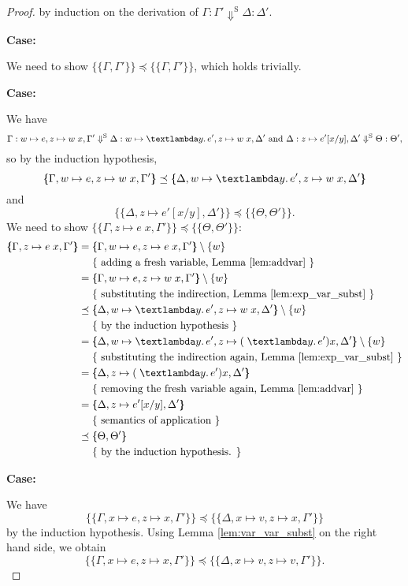 \documentclass{jfp1}
\theoremstyle{nonumberbreak}
\newtheorem{proof}{Proof}
\newcommand{\sApp}[2]{#1\;#2}
\newcommand{\sLam}[2]{\text{\textlambda} #1.\, #2}
\newcommand{\ssred}[4]{#1 : #2 \Downarrow^{\textrm{S}} #3 : #4}
\newcommand{\sRule}[1]{\text{{\textsc{#1}}}}
\newcommand{\esem}[1]{\{\!\!\!\{#1\}\!\!\!\}}
\newcommand{\case}[1]{\par\smallskip\noindent\textbf{Case:} #1\nopagebreak\par\noindent\ignorespaces}
\newcommand{\aexpl}[1]{&\mathrel{\phantom{=}}\left\{\text{ #1 }\right\}}
\begin{document}
\begin{proof}
by induction on the derivation of $\ssred \Gamma {\Gamma'} {\Delta} {\Delta'}$.

\case{\sRule{Lam}}
We need to show $\esem{\Gamma, \Gamma'} \preceq \esem{\Gamma, \Gamma'}$, which holds trivially.

\case{\sRule{App}}
We have
\[
\ssred{\Gamma}{w \mapsto e, z \mapsto \sApp w x, \Gamma'}{\Delta}{w \mapsto \sLam y e', z \mapsto \sApp w x, \Delta'}
\text{ and }
\ssred{\Delta}{z \mapsto e'[x/y], \Delta'}{\Theta}{\Theta'},
\]
so by the induction hypothesis,
\[
\esem{\Gamma, w \mapsto e, z \mapsto \sApp w x, \Gamma'} \preceq \esem{\Delta, w \mapsto \sLam y e', z \mapsto \sApp w x, \Delta'}
\]
and
\[
\esem{\Delta,z \mapsto e'[x/y], \Delta'} \preceq \esem{\Theta,\Theta'}.
\]
We need to show $\esem{\Gamma, z \mapsto \sApp e x, \Gamma'} \preceq \esem{\Theta,\Theta'}$:
\begin{align*}
\esem{\Gamma, z \mapsto \sApp e x, \Gamma'} &= \esem{\Gamma, w \mapsto e, z\mapsto \sApp e x, \Gamma'} \setminus \{w\} \\
\aexpl{adding a fresh variable, Lemma \ref{lem:addvar}} \\
&= \esem{\Gamma, w \mapsto e, z \mapsto \sApp w x, \Gamma'} \setminus \{w\} \\
\aexpl{substituting the indirection, Lemma \ref{lem:exp_var_subst}} \\
&\preceq \esem{\Delta, w \mapsto \sLam y e', z \mapsto \sApp w x, \Delta'} \setminus \{w\}\\
\aexpl{by the induction hypothesis} \\
&= \esem{\Delta, w \mapsto \sLam y e', z \mapsto \sApp (\sLam y e') x, \Delta'} \setminus \{w\} \\
\aexpl{substituting the indirection again, Lemma \ref{lem:exp_var_subst}} \\
&= \esem{\Delta, z \mapsto \sApp (\sLam y e') x, \Delta'}\\
\aexpl{removing the fresh variable again, Lemma \ref{lem:addvar}} \\
&= \esem{\Delta, z \mapsto e'[x/y], \Delta'} \\
\aexpl{semantics of application} \\
&\preceq \esem{\Theta,\Theta'}\\
\aexpl{by the induction hypothesis.}
\end{align*}

\case{\sRule{Var}}
We have 
\[
\esem{\Gamma, x \mapsto e, z\mapsto x, \Gamma'} \preceq \esem{\Delta, x \mapsto v, z\mapsto x, \Gamma'}
\]
by the induction hypothesis. Using Lemma \ref{lem:var_var_subst} on the right hand side, we obtain
\[
\esem{\Gamma, x\mapsto e,z \mapsto x, \Gamma'} \preceq \esem{\Delta, x \mapsto v, z \mapsto v, \Gamma'}.
\]


\end{proof}
\end{document}
